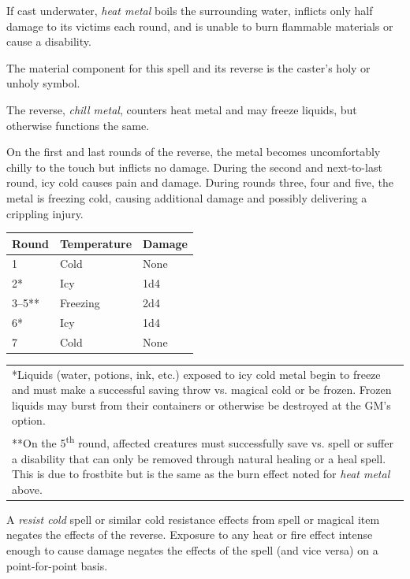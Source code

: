 \begin{multicols}{2}
If cast underwater, \textit{heat metal} boils the surrounding water, inflicts only half damage to its victims each round, and is unable to burn flammable materials or cause a disability.

The material component for this spell and its reverse is the caster's holy or unholy symbol.

The reverse, \textit{chill metal}, counters heat metal and may freeze liquids, but otherwise functions the same.

On the first and last rounds of the reverse, the metal becomes uncomfortably chilly to the touch but inflicts no damage.  During the second and next-to-last round, icy cold causes pain and damage.  During rounds three, four and five, the metal is freezing cold, causing additional damage and possibly delivering a crippling injury.

\noindent
\begin{tabular}{|p{}|p{}|p{}|}
\hline
Round	& Temperature	& Damage \\
\hline\hline
\rowcolor[gray]{.9}1	& Cold	& None \\
2*	& Icy	& 1d4 \\
\rowcolor[gray]{.9}3--5**	& Freezing	& 2d4 \\
6*	& Icy	& 1d4 \\
\rowcolor[gray]{.9}7	& Cold	& None \\
\hline
\end{tabular}
\noindent\begin{tabular}{p{}}
*Liquids (water, potions, ink, etc.) exposed to icy cold metal begin to freeze and must make a successful saving throw vs. magical cold or be frozen. Frozen liquids may burst from their containers or otherwise be destroyed at the GM's option. \\
**On the 5\textsuperscript{th} round, affected creatures must successfully save vs. spell or suffer a disability that can only be removed through natural healing or a heal spell.  This is due to frostbite but is the same as the burn effect noted for \textit{heat metal} above. \\
\end{tabular}\vspace{.5em}

A \textit{resist cold} spell or similar cold resistance effects from spell or magical item negates the effects of the reverse.  Exposure to any heat or fire effect intense enough to cause damage negates the effects of the spell (and vice versa) on a point-for-point basis.


\end{multicols}
